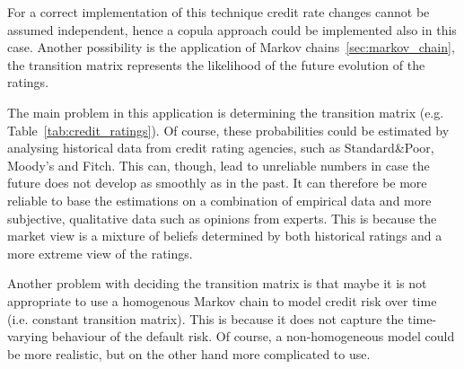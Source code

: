For a correct implementation of this technique credit rate changes cannot be assumed independent, hence a copula approach could be implemented also in this case.
Another possibility is the application of Markov chains~\ref{sec:markov_chain}, the transition matrix represents the likelihood of the future evolution of the ratings.

The main problem in this application is determining the transition matrix (e.g. Table~\ref{tab:credit_ratings}). Of course, these probabilities could be estimated by analysing historical data from credit rating agencies, such as Standard\&Poor, Moody’s and Fitch. This can, though, lead to unreliable numbers in case the future does not develop as smoothly as in the past. It can therefore be more reliable to base the estimations on a combination of empirical data and more subjective, qualitative data such as opinions from experts. This is because the market view is a mixture of beliefs determined by both historical ratings and a more extreme view of the ratings. 

Another problem with deciding the transition matrix is that maybe it is not appropriate to use a homogenous Markov chain to model credit risk over time (i.e. constant transition matrix). This is because it does not capture the time-varying behaviour of the default risk. Of course, a non-homogeneous model
could be more realistic, but on the other hand more complicated to use. 

